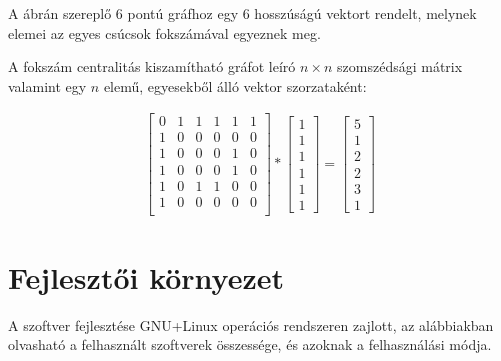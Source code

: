 \documentclass[12pt,numbers=noenddot]{report}
\begin{document}
\vspace{0.5cm}

A ábrán szereplő 6 pontú gráfhoz egy 6 hosszúságú vektort rendelt, melynek elemei az egyes csúcsok fokszámával egyeznek meg.

A fokszám centralitás kiszamítható gráfot leíró $n \times n$ szomszédsági mátrix valamint egy $n$ elemű, egyesekből álló vektor szorzataként:

\begin{align}
	\begin{bmatrix}
		0 & 1 & 1 & 1 & 1 & 1 \\
		1 & 0 & 0 & 0 & 0 & 0 \\
		1 & 0 & 0 & 0 & 1 & 0 \\
		1 & 0 & 0 & 0 & 1 & 0 \\
		1 & 0 & 1 & 1 & 0 & 0 \\
		1 & 0 & 0 & 0 & 0 & 0 \\
	\end{bmatrix}
	*
	\begin{bmatrix}
		1\\
		1\\
		1\\
		1\\
		1\\
		1
	\end{bmatrix}
	=
	\begin{bmatrix}
		5\\
		1\\
		2\\
		2\\
		3\\
		1
	\end{bmatrix}
\end{align}




\chapter{Fejlesztői környezet}

A szoftver fejlesztése GNU+Linux operációs rendszeren zajlott, az alábbiakban
olvasható a felhasznált szoftverek összessége, és azoknak a felhasználási módja.

\end{document}
